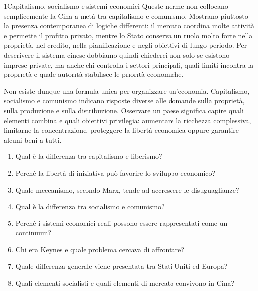 \begin{lettura}{1}{Capitalismo, socialismo e sistemi economici}
Queste norme non collocano semplicemente la Cina a metà tra capitalismo e comunismo. Mostrano piuttosto la presenza contemporanea di logiche differenti: il mercato coordina molte attività e permette il profitto privato, mentre lo Stato conserva un ruolo molto forte nella proprietà, nel credito, nella pianificazione e negli obiettivi di lungo periodo. Per descrivere il sistema cinese dobbiamo quindi chiederci non solo se esistono imprese private, ma anche chi controlla i settori principali, quali limiti incontra la proprietà e quale autorità stabilisce le priorità economiche.

Non esiste dunque una formula unica per organizzare un'economia. Capitalismo, socialismo e comunismo indicano risposte diverse alle domande sulla proprietà, sulla produzione e sulla distribuzione. Osservare un paese significa capire quali elementi combina e quali obiettivi privilegia: aumentare la ricchezza complessiva, limitarne la concentrazione, proteggere la libertà economica oppure garantire alcuni beni a tutti.

\attivita
\begin{enumerate}
\item Qual è la differenza tra capitalismo e liberismo?
\item Perché la libertà di iniziativa può favorire lo sviluppo economico?
\item Quale meccanismo, secondo Marx, tende ad accrescere le disuguaglianze?
\item Qual è la differenza tra socialismo e comunismo?
\item Perché i sistemi economici reali possono essere rappresentati come un continuum?
\item Chi era Keynes e quale problema cercava di affrontare?
\item Quale differenza generale viene presentata tra Stati Uniti ed Europa?
\item Quali elementi socialisti e quali elementi di mercato convivono in Cina?
\end{enumerate}

\lessico
{}


\end{lettura}
